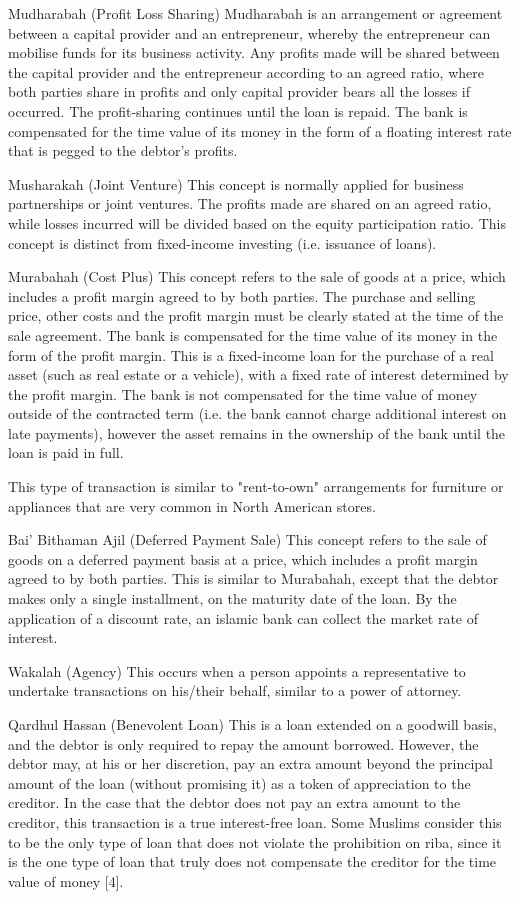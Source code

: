 Mudharabah (Profit Loss Sharing)
Mudharabah is an arrangement or agreement between a capital provider and an entrepreneur, whereby the entrepreneur can mobilise funds for its business activity. Any profits made will be shared between the capital provider and the entrepreneur according to an agreed ratio, where both parties share in profits and only capital provider bears all the losses if occurred. The profit-sharing continues until the loan is repaid. The bank is compensated for the time value of its money in the form of a floating interest rate that is pegged to the debtor's profits.


Musharakah (Joint Venture)
This concept is normally applied for business partnerships or joint ventures. The profits made are shared on an agreed ratio, while losses incurred will be divided based on the equity participation ratio. This concept is distinct from fixed-income investing (i.e. issuance of loans).


Murabahah (Cost Plus)
This concept refers to the sale of goods at a price, which includes a profit margin agreed to by both parties. The purchase and selling price, other costs and the profit margin must be clearly stated at the time of the sale agreement. The bank is compensated for the time value of its money in the form of the profit margin. This is a fixed-income loan for the purchase of a real asset (such as real estate or a vehicle), with a fixed rate of interest determined by the profit margin. The bank is not compensated for the time value of money outside of the contracted term (i.e. the bank cannot charge additional interest on late payments), however the asset remains in the ownership of the bank until the loan is paid in full.

This type of transaction is similar to "rent-to-own" arrangements for furniture or appliances that are very common in North American stores.


Bai' Bithaman Ajil (Deferred Payment Sale)
This concept refers to the sale of goods on a deferred payment basis at a price, which includes a profit margin agreed to by both parties. This is similar to Murabahah, except that the debtor makes only a single installment, on the maturity date of the loan. By the application of a discount rate, an islamic bank can collect the market rate of interest.


Wakalah (Agency)
This occurs when a person appoints a representative to undertake transactions on his/their behalf, similar to a power of attorney.


Qardhul Hassan (Benevolent Loan)
This is a loan extended on a goodwill basis, and the debtor is only required to repay the amount borrowed. However, the debtor may, at his or her discretion, pay an extra amount beyond the principal amount of the loan (without promising it) as a token of appreciation to the creditor. In the case that the debtor does not pay an extra amount to the creditor, this transaction is a true interest-free loan. Some Muslims consider this to be the only type of loan that does not violate the prohibition on riba, since it is the one type of loan that truly does not compensate the creditor for the time value of money [4].


